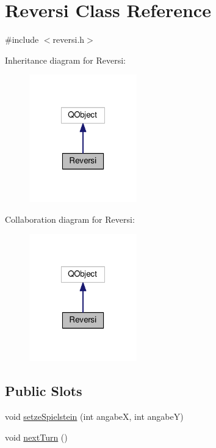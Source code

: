 \hypertarget{classReversi}{\section{Reversi Class Reference}
\label{classReversi}
}


{\ttfamily \#include $<$reversi.\-h$>$}



Inheritance diagram for Reversi\-:\nopagebreak
\begin{figure}[H]
\begin{center}
\leavevmode
\includegraphics[width=132pt]{classReversi__inherit__graph}
\end{center}
\end{figure}


Collaboration diagram for Reversi\-:\nopagebreak
\begin{figure}[H]
\begin{center}
\leavevmode
\includegraphics[width=132pt]{classReversi__coll__graph}
\end{center}
\end{figure}
\subsection*{Public Slots}
\begin{DoxyCompactItemize}
\item 
void \hyperlink{classReversi_a87d94f3c3325867453b5008b45829bd8}{setze\-Spielstein} (int angabe\-X, int angabe\-Y)
\item 
void \hyperlink{classReversi_a3e8988d0d227389d09673d4b5968a922}{next\-Turn} ()
\end{DoxyCompactItemize}
